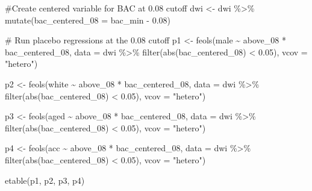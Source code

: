 \documentclass[
  letterpaper,
  DIV=11,
  numbers=noendperiod]{scrartcl}
\newenvironment{Shaded}{\begin{snugshade}}{\end{snugshade}}
\newcommand{\AttributeTok}[1]{\textcolor[rgb]{0.40,0.45,0.13}{#1}}
\newcommand{\CommentTok}[1]{\textcolor[rgb]{0.37,0.37,0.37}{#1}}
\newcommand{\FloatTok}[1]{\textcolor[rgb]{0.68,0.00,0.00}{#1}}
\newcommand{\FunctionTok}[1]{\textcolor[rgb]{0.28,0.35,0.67}{#1}}
\newcommand{\NormalTok}[1]{\textcolor[rgb]{0.00,0.23,0.31}{#1}}
\newcommand{\OtherTok}[1]{\textcolor[rgb]{0.00,0.23,0.31}{#1}}
\newcommand{\SpecialCharTok}[1]{\textcolor[rgb]{0.37,0.37,0.37}{#1}}
\newcommand{\StringTok}[1]{\textcolor[rgb]{0.13,0.47,0.30}{#1}}
\begin{document}
\begin{Shaded}
\begin{Highlighting}[]
\CommentTok{\#Create centered variable for BAC at 0.08 cutoff}
\NormalTok{dwi }\OtherTok{\textless{}{-}}\NormalTok{ dwi }\SpecialCharTok{\%\textgreater{}\%}
  \FunctionTok{mutate}\NormalTok{(}\AttributeTok{bac\_centered\_08 =}\NormalTok{ bac\_min }\SpecialCharTok{{-}} \FloatTok{0.08}\NormalTok{)}

\CommentTok{\# Run placebo regressions at the 0.08 cutoff}
\NormalTok{p1 }\OtherTok{\textless{}{-}} \FunctionTok{feols}\NormalTok{(male  }\SpecialCharTok{\textasciitilde{}}\NormalTok{ above\_08 }\SpecialCharTok{*}\NormalTok{ bac\_centered\_08,}
            \AttributeTok{data =}\NormalTok{ dwi }\SpecialCharTok{\%\textgreater{}\%} \FunctionTok{filter}\NormalTok{(}\FunctionTok{abs}\NormalTok{(bac\_centered\_08) }\SpecialCharTok{\textless{}} \FloatTok{0.05}\NormalTok{),}
            \AttributeTok{vcov =} \StringTok{"hetero"}\NormalTok{)}

\NormalTok{p2 }\OtherTok{\textless{}{-}} \FunctionTok{feols}\NormalTok{(white }\SpecialCharTok{\textasciitilde{}}\NormalTok{ above\_08 }\SpecialCharTok{*}\NormalTok{ bac\_centered\_08,}
            \AttributeTok{data =}\NormalTok{ dwi }\SpecialCharTok{\%\textgreater{}\%} \FunctionTok{filter}\NormalTok{(}\FunctionTok{abs}\NormalTok{(bac\_centered\_08) }\SpecialCharTok{\textless{}} \FloatTok{0.05}\NormalTok{),}
            \AttributeTok{vcov =} \StringTok{"hetero"}\NormalTok{)}

\NormalTok{p3 }\OtherTok{\textless{}{-}} \FunctionTok{feols}\NormalTok{(aged  }\SpecialCharTok{\textasciitilde{}}\NormalTok{ above\_08 }\SpecialCharTok{*}\NormalTok{ bac\_centered\_08,}
            \AttributeTok{data =}\NormalTok{ dwi }\SpecialCharTok{\%\textgreater{}\%} \FunctionTok{filter}\NormalTok{(}\FunctionTok{abs}\NormalTok{(bac\_centered\_08) }\SpecialCharTok{\textless{}} \FloatTok{0.05}\NormalTok{),}
            \AttributeTok{vcov =} \StringTok{"hetero"}\NormalTok{)}

\NormalTok{p4 }\OtherTok{\textless{}{-}} \FunctionTok{feols}\NormalTok{(acc   }\SpecialCharTok{\textasciitilde{}}\NormalTok{ above\_08 }\SpecialCharTok{*}\NormalTok{ bac\_centered\_08,}
            \AttributeTok{data =}\NormalTok{ dwi }\SpecialCharTok{\%\textgreater{}\%} \FunctionTok{filter}\NormalTok{(}\FunctionTok{abs}\NormalTok{(bac\_centered\_08) }\SpecialCharTok{\textless{}} \FloatTok{0.05}\NormalTok{),}
            \AttributeTok{vcov =} \StringTok{"hetero"}\NormalTok{)}

\FunctionTok{etable}\NormalTok{(p1, p2, p3, p4)}
\end{Highlighting}
\end{Shaded}
\end{document}
